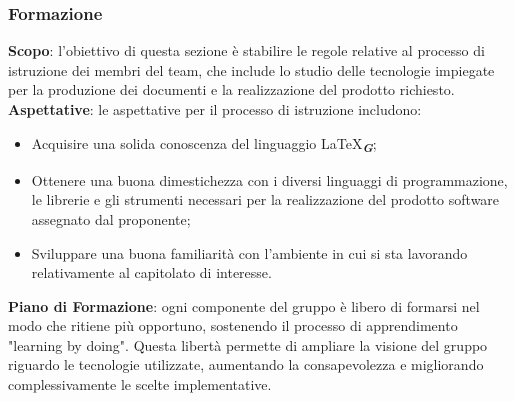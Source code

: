 \subsubsection{Formazione}
\textbf{Scopo}: l'obiettivo di questa sezione è stabilire le regole relative al processo di istruzione dei membri del team, 
che include lo studio delle tecnologie impiegate per la produzione dei documenti e la realizzazione del prodotto richiesto.
\textbf{Aspettative}: le aspettative per il processo di istruzione includono:
\begin{itemize}
    \item Acquisire una solida conoscenza del linguaggio \LaTeX\textsubscript{\textit{\textbf{G}}};
    \item Ottenere una buona dimestichezza con i diversi linguaggi di programmazione, le librerie e gli strumenti necessari per la realizzazione del prodotto software assegnato dal proponente;
    \item Sviluppare una buona familiarità con l'ambiente in cui si sta lavorando relativamente al capitolato di interesse.
\end{itemize}
\textbf{Piano di Formazione}: ogni componente del gruppo è libero di formarsi nel modo che ritiene più opportuno, sostenendo il processo di apprendimento "learning by doing". Questa libertà permette di ampliare la visione del gruppo riguardo le tecnologie utilizzate, aumentando la consapevolezza e migliorando complessivamente le scelte implementative.